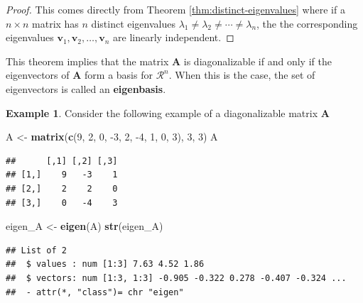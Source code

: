 \documentclass[
]{book}
\newenvironment{Shaded}{\begin{snugshade}}{\end{snugshade}}
\newcommand{\DecValTok}[1]{\textcolor[rgb]{0.00,0.00,0.81}{#1}}
\newcommand{\KeywordTok}[1]{\textcolor[rgb]{0.13,0.29,0.53}{\textbf{#1}}}
\newcommand{\NormalTok}[1]{#1}
\newcommand{\OperatorTok}[1]{\textcolor[rgb]{0.81,0.36,0.00}{\textbf{#1}}}
\newcommand{\StringTok}[1]{\textcolor[rgb]{0.31,0.60,0.02}{#1}}
\theoremstyle{definition}
\theoremstyle{definition}
\newtheorem{example}{Example}[chapter]
\theoremstyle{definition}
\theoremstyle{definition}
\theoremstyle{remark}
\begin{document}
\begin{proof}
This comes directly from Theorem \ref{thm:distinct-eigenvalues} where if a \(n \times n\) matrix has \(n\) distinct eigenvalues \(\lambda_1 \neq \lambda_2 \neq \cdots \neq \lambda_n\), the the corresponding eigenvalues \(\mathbf{v}_1, \mathbf{v}_2, \ldots, \mathbf{v}_n\) are linearly independent.
\end{proof}

This theorem implies that the matrix \(\mathbf{A}\) is diagonalizable if and only if the eigenvectors of \(\mathbf{A}\) form a basis for \(\mathcal{R}^n\). When this is the case, the set of eigenvectors is called an \textbf{eigenbasis}.

\begin{example}

Consider the following example of a diagonalizable matrix \(\mathbf{A}\)

\begin{Shaded}
\begin{Highlighting}[]
\NormalTok{A <-}\StringTok{ }\KeywordTok{matrix}\NormalTok{(}\KeywordTok{c}\NormalTok{(}\DecValTok{9}\NormalTok{, }\DecValTok{2}\NormalTok{, }\DecValTok{0}\NormalTok{, }\DecValTok{-3}\NormalTok{, }\DecValTok{2}\NormalTok{, }\DecValTok{-4}\NormalTok{, }\DecValTok{1}\NormalTok{, }\DecValTok{0}\NormalTok{, }\DecValTok{3}\NormalTok{), }\DecValTok{3}\NormalTok{, }\DecValTok{3}\NormalTok{)}
\NormalTok{A}
\end{Highlighting}
\end{Shaded}

\begin{verbatim}
##      [,1] [,2] [,3]
## [1,]    9   -3    1
## [2,]    2    2    0
## [3,]    0   -4    3
\end{verbatim}

\begin{Shaded}
\begin{Highlighting}[]
\NormalTok{eigen_A <-}\StringTok{ }\KeywordTok{eigen}\NormalTok{(A)}
\KeywordTok{str}\NormalTok{(eigen_A)}
\end{Highlighting}
\end{Shaded}

\begin{verbatim}
## List of 2
##  $ values : num [1:3] 7.63 4.52 1.86
##  $ vectors: num [1:3, 1:3] -0.905 -0.322 0.278 -0.407 -0.324 ...
##  - attr(*, "class")= chr "eigen"
\end{verbatim}

\begin{Shaded}
\end{Shaded}


\end{example}
\end{document}
